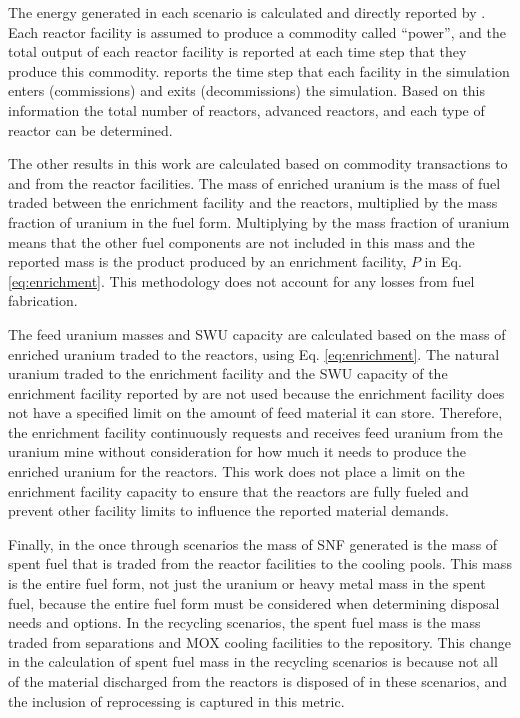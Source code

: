 The energy generated in each scenario is calculated and directly 
reported by \Cyclus. Each reactor facility is assumed to produce a 
commodity called ``power'', and the total output of each reactor facility 
is reported at each time step that they produce this commodity. 
\Cyclus reports the time step that each facility in the simulation enters 
(commissions) and exits (decommissions) the simulation. Based on 
this information the total number of reactors, advanced reactors, and 
each type of reactor can be determined. 

The other results in this work are calculated based on commodity 
transactions to and from the reactor facilities. The mass of enriched 
uranium is the mass of fuel traded between the enrichment facility and 
the reactors, multiplied by the mass fraction of uranium in the fuel 
form. Multiplying by the mass fraction of uranium means that the other 
fuel components are not included in this mass and the reported mass is 
the product produced by an enrichment facility, $P$ in Eq. 
\ref{eq:enrichment}. This methodology does not account for any 
losses from fuel fabrication.

The feed uranium masses and \gls{SWU} capacity are calculated 
based on the mass of enriched uranium traded to the reactors, using 
Eq. \ref{eq:enrichment}. The natural uranium traded to the enrichment 
facility and the \gls{SWU} capacity of the enrichment facility reported 
by 
\Cyclus are not used because the enrichment facility does not have a 
specified limit on the amount of feed material it can store. Therefore, 
the enrichment facility continuously requests and receives feed 
uranium from the uranium mine without consideration for how much it needs 
to produce the enriched uranium for the reactors. This work does not 
place a limit on the enrichment facility capacity to ensure that the 
reactors are fully fueled and prevent other facility limits to 
influence the reported material demands. 

Finally, in the once through scenarios the mass of \gls{SNF} generated is 
the mass of spent fuel that is 
traded from the reactor facilities to the cooling pools. This mass is the 
entire fuel form, not just the uranium or heavy metal mass in the spent 
fuel, because the entire fuel form must be considered when determining 
disposal needs and options. In the recycling scenarios, the spent fuel 
mass is the mass traded from separations and \gls{MOX} cooling facilities 
to the repository. This change in the calculation of spent fuel mass 
in the recycling scenarios is because not all of the material discharged 
from the reactors is disposed of in these scenarios, and the inclusion of 
reprocessing is captured in this metric. 
